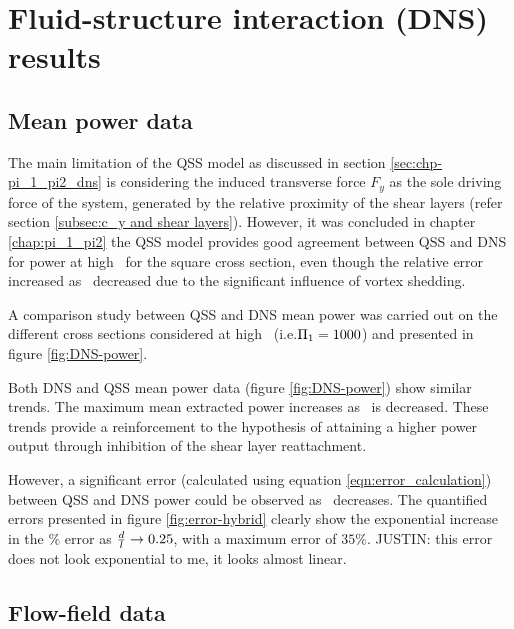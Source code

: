 \section{Fluid-structure interaction (DNS) results}
\label{sec:cross-sec-FSI-results}

\subsection{Mean power data}
\label{subsec:cross-sec-dns-mean-power}

 The main limitation of the QSS model as discussed in section \ref{sec:chp-pi_1_pi2_dns} is considering the induced transverse force $F_{y}$ as the sole driving force of the system, generated by the relative proximity of the shear layers (refer section \ref{subsec:c_y and shear layers}). However, it was concluded in chapter \ref{chap:pi_1_pi2} the QSS model provides good agreement between QSS and DNS for power at high \massstiff\ for the square cross section, even though the relative error increased as \massstiff\ decreased due to the significant influence of vortex shedding.


  A comparison study between QSS and DNS mean power was carried out on the different cross sections considered at high \massstiff\ (i.e.$\Pi_1=1000$) and presented in figure \ref{fig:DNS-power}.


Both  DNS and QSS mean power data (figure \ref{fig:DNS-power}) show similar trends. The maximum mean extracted power increases as \ratio\ is decreased. These trends provide a reinforcement to the hypothesis of attaining a higher power output through inhibition of the shear layer reattachment.   

However, a significant error (calculated using equation \ref{eqn:error_calculation}) between QSS and DNS power could be observed as \ratio\ decreases. The quantified errors presented in figure \ref{fig:error-hybrid} clearly show the exponential increase in the $\%$ error as $\frac{d}{l} \rightarrow 0.25$, with a maximum error of $35\%$. JUSTIN: this error does not look exponential to me, it looks almost linear.



\subsection{Flow-field data}

